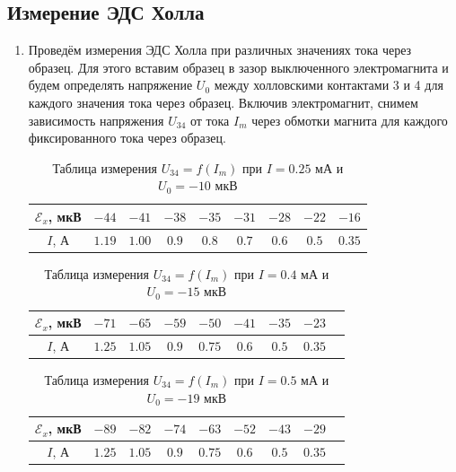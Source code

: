 \documentclass[12pt]{article}
\begin{document}
\subsection*{Измерение ЭДС Холла}
\begin{enumerate}
	\item
		Проведём измерения ЭДС Холла при различных значениях тока через образец. Для этого 			вставим образец в зазор выключенного электромагнита и будем определять напряжение $U_0$ 		между холловскими контактами 3 и 4 для каждого значения тока через образец. Включив 			электромагнит, снимем зависимость напряжения $U_\text{34}$ от тока $I_m$ через обмотки 			магнита для каждого фиксированного тока через образец.
    \begin{table}[h!]
		\centering
		\begin{tabular}{|c|c|c|c|c|c|c|c|c|}
		\hline
			$\mathscr{E}_x$, мкВ & $-44$ & $-41$ & $-38$ & $-35$ & $-31$ & $-28$ & $-22$ & $-16$ \\
		\hline
			$I$, А & $1.19$ & $1.00$ & $0.9$ & $0.8$ & $0.7$ & $0.6$ & $0.5$ & $0.35$ \\
		\hline	
		\end{tabular}
		\caption{Таблица измерения $U_\text{34} = f(I_m)$ при $I = 0.25$ мА и $U_0 = -10 $ мкВ}
	\end{table}
	\begin{table}[h!]
		\centering
		\begin{tabular}{|c|c|c|c|c|c|c|c|c|}
		\hline
			$\mathscr{E}_x$, мкВ & $-71$ & $-65$ & $-59$ & $-50$ & $-41$ & $-35$ & $-23$ \\
		\hline
			$I$, А & $1.25$ & $1.05$ & $0.9$ & $0.75$ & $0.6$ & $0.5$ & $0.35$ \\
		\hline	
		\end{tabular}
		\caption{Таблица измерения $U_\text{34} = f(I_m)$ при $I = 0.4$ мА и $U_0 = -15 $ мкВ}
	\end{table}
	\begin{table}[h!]
		\centering
		\begin{tabular}{|c|c|c|c|c|c|c|c|c|}
		\hline
			$\mathscr{E}_x$, мкВ & $-89$ & $-82$ & $-74$ & $-63$ & $-52$ & $-43$ & $-29$ \\
		\hline
			$I$, А & $1.25$ & $1.05$ & $0.9$ & $0.75$ & $0.6$ & $0.5$ & $0.35$ \\
		\hline	
		\end{tabular}		
		\caption{Таблица измерения $U_\text{34} = f(I_m)$ при $I = 0.5$ мА и $U_0 = -19 $ мкВ}
	\end{table}
	\newpage
	\begin{table}[h!]

\end{table}
\end{enumerate}
\end{document}

